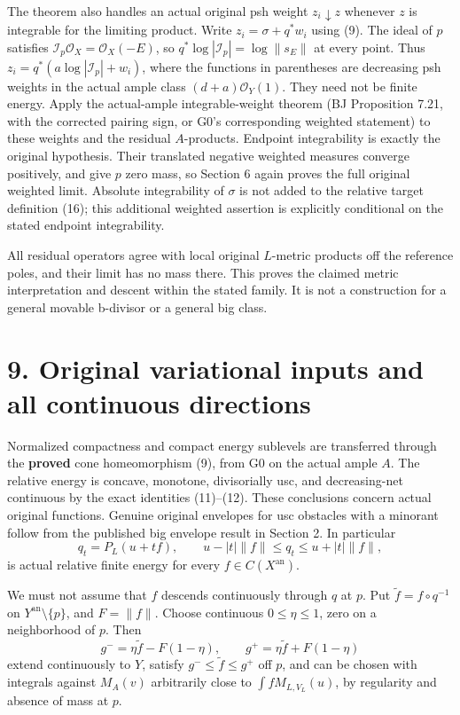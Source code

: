 \documentclass[
  10pt,
]{article}
\begin{document}
The theorem also handles an actual original psh weight
\(z_i\downarrow z\) whenever \(z\) is integrable for the limiting
product. Write \(z_i=\sigma+q^*w_i\) using (9). The ideal of \(p\)
satisfies \(\mathcal I_p\mathcal O_X=\mathcal O_X(-E)\), so
\(q^*\log|\mathcal I_p|=\log\|s_E\|\) at every point. Thus
\(z_i=q^*(a\log|\mathcal I_p|+w_i)\), where the functions in parentheses
are decreasing psh weights in the actual ample class
\((d+a)\mathcal O_Y(1)\). They need not be finite energy. Apply the
actual-ample integrable-weight theorem (BJ Proposition 7.21, with the
corrected pairing sign, or G0's corresponding weighted statement) to
these weights and the residual \(A\)-products. Endpoint integrability is
exactly the original hypothesis. Their translated negative weighted
measures converge positively, and give \(p\) zero mass, so Section 6
again proves the full original weighted limit. Absolute integrability of
\(\sigma\) is not added to the relative target definition (16); this
additional weighted assertion is explicitly conditional on the stated
endpoint integrability.

All residual operators agree with local original \(L\)-metric products
off the reference poles, and their limit has no mass there. This proves
the claimed metric interpretation and descent within the stated family.
It is not a construction for a general movable b-divisor or a general
big class.

\section{9. Original variational inputs and all continuous
directions}\label{original-variational-inputs-and-all-continuous-directions}

Normalized compactness and compact energy sublevels are transferred
through the \textbf{proved} cone homeomorphism (9), from G0 on the
actual ample \(A\). The relative energy is concave, monotone,
divisorially usc, and decreasing-net continuous by the exact identities
(11)--(12). These conclusions concern actual original functions. Genuine
original envelopes for usc obstacles with a minorant follow from the
published big envelope result in Section 2. In particular
\[q_t=P_L(u+tf),\qquad u-|t|\|f\|\le q_t\le u+|t|\|f\|,\] is actual
relative finite energy for every \(f\in C(X^{\mathrm{an}})\).

We must not assume that \(f\) descends continuously through \(q\) at
\(p\). Put \(\widetilde f=f\circ q^{-1}\) on
\(Y^{\mathrm{an}}\setminus\{p\}\), and \(F=\|f\|\). Choose continuous
\(0\le\eta\le1\), zero on a neighborhood of \(p\). Then
\[g^-=\eta\widetilde f-F(1-\eta),\qquad
  g^+=\eta\widetilde f+F(1-\eta)\] extend continuously to \(Y\), satisfy
\(g^-\le\widetilde f\le g^+\) off \(p\), and can be chosen with
integrals against \(M_A(v)\) arbitrarily close to
\(\int fM_{L,V_L}(u)\), by regularity and absence of mass at \(p\).
\end{document}
